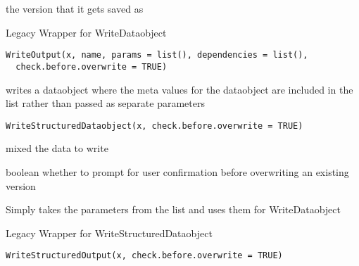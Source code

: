 \documentclass[a4paper]{book}
\begin{document}
%
\begin{Value}
the version that it gets saved as
\end{Value}
%
\begin{Description}\relax
Legacy Wrapper for WriteDataobject
\end{Description}
%
\begin{Usage}
\begin{verbatim}
WriteOutput(x, name, params = list(), dependencies = list(),
  check.before.overwrite = TRUE)
\end{verbatim}
\end{Usage}
%
\begin{Description}\relax
writes a dataobject where the meta values for the dataobject are included in the list
rather than passed as separate parameters
\end{Description}
%
\begin{Usage}
\begin{verbatim}
WriteStructuredDataobject(x, check.before.overwrite = TRUE)
\end{verbatim}
\end{Usage}
%
\begin{Arguments}
\begin{ldescription}
\item[\code{x}] mixed the data to write

\item[\code{check.before.overwrite}] boolean whether to prompt for user confirmation before overwriting an existing version
\end{ldescription}
\end{Arguments}
%
\begin{Details}\relax
Simply takes the parameters from the list and uses them for WriteDataobject
\end{Details}
%
\begin{Description}\relax
Legacy Wrapper for WriteStructuredDataobject
\end{Description}
%
\begin{Usage}
\begin{verbatim}
WriteStructuredOutput(x, check.before.overwrite = TRUE)
\end{verbatim}
\end{Usage}
\printindex{}
\end{document}
